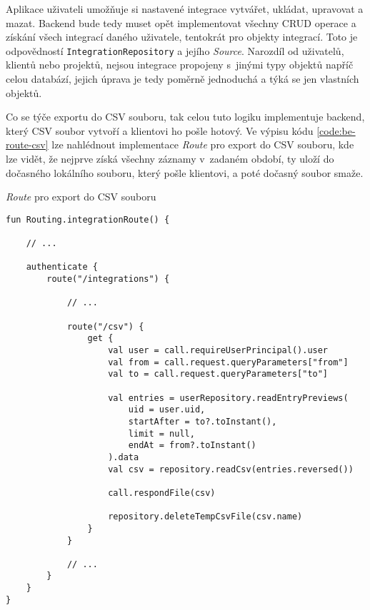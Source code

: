Aplikace uživateli umožňuje si nastavené integrace vytvářet, ukládat, upravovat a mazat. Backend bude tedy muset opět implementovat všechny CRUD operace a získání všech integrací daného uživatele, tentokrát pro objekty integrací. Toto je odpovědností \texttt{IntegrationRepository} a jejího \emph{Source}. Narozdíl od uživatelů, klientů nebo projektů, nejsou integrace propojeny s~jinými typy objektů napříč celou databází, jejich úprava je tedy poměrně jednoduchá a týká se jen vlastních objektů.

Co se týče exportu do CSV souboru, tak celou tuto logiku implementuje backend, který CSV soubor vytvoří a klientovi ho pošle hotový. Ve výpisu kódu \ref{code:be-route-csv} lze nahlédnout implementace \emph{Route} pro export do CSV souboru, kde lze vidět, že nejprve získá všechny záznamy v~zadaném období, ty uloží do dočasného lokálního souboru, který pošle klientovi, a poté dočasný soubor smaže.

\begin{listing}
\caption{\emph{Route} pro export do CSV souboru}\label{code:be-route-csv}
\begin{verbatim}
fun Routing.integrationRoute() {

    // ...
    
    authenticate {
        route("/integrations") {
        
            // ...
            
            route("/csv") {
                get {
                    val user = call.requireUserPrincipal().user
                    val from = call.request.queryParameters["from"]
                    val to = call.request.queryParameters["to"]

                    val entries = userRepository.readEntryPreviews(
                        uid = user.uid,
                        startAfter = to?.toInstant(),
                        limit = null,
                        endAt = from?.toInstant()
                    ).data
                    val csv = repository.readCsv(entries.reversed())

                    call.respondFile(csv)

                    repository.deleteTempCsvFile(csv.name)
                }
            }
            
            // ...
        }
    }
}       
\end{verbatim}
\end{listing}

